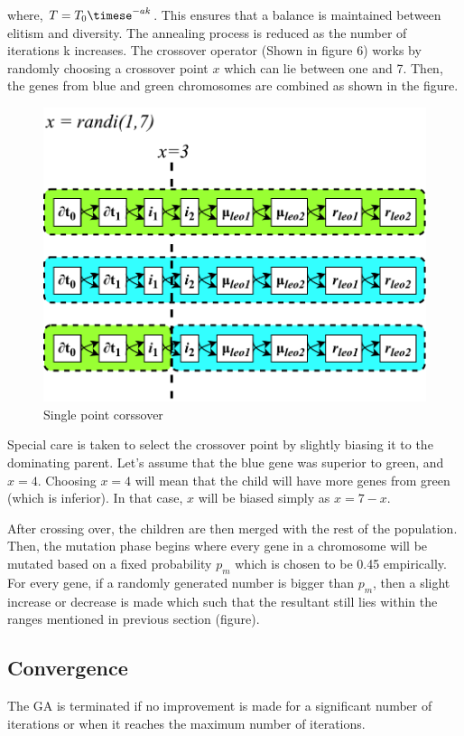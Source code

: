 \documentclass[11pt,a4paper]{article}
\begin{document}
\begin{multicols}{2}
where, $T= T_0\timese^{-ak}$. This ensures that a balance is maintained between elitism and diversity. The annealing process is reduced as the number of iterations k increases. The crossover operator (Shown in figure 6) works by randomly choosing a crossover point $x$ which can lie between one and 7. Then, the genes from blue and green chromosomes are combined as shown in the figure. 

\begin{figure}[H]
\centering
\includegraphics{images/OnePointCrossover.pdf}
\caption{Single point corssover}
\end{figure}

Special care is taken to select the crossover point by slightly biasing it to the dominating parent. Let's assume that the blue gene was superior to green, and $x=4$. Choosing  $x=4$ will mean that the child will have more genes from green (which is inferior). In that case, $x$ will be biased simply as $x=7-x$.

After crossing over, the children are then merged with the rest of the population. Then, the mutation phase begins where every gene in a chromosome will be mutated based on a fixed probability $p_m$ which is chosen to be 0.45 empirically. For every gene, if a randomly generated number is bigger than $p_m$, then a slight increase or decrease is made which such that the resultant still lies within the ranges mentioned in previous section (figure). 

\subsection{Convergence}
The GA is terminated if no improvement is made for a significant number of iterations or when it reaches the maximum number of iterations.
\end{multicols}
\end{document}

